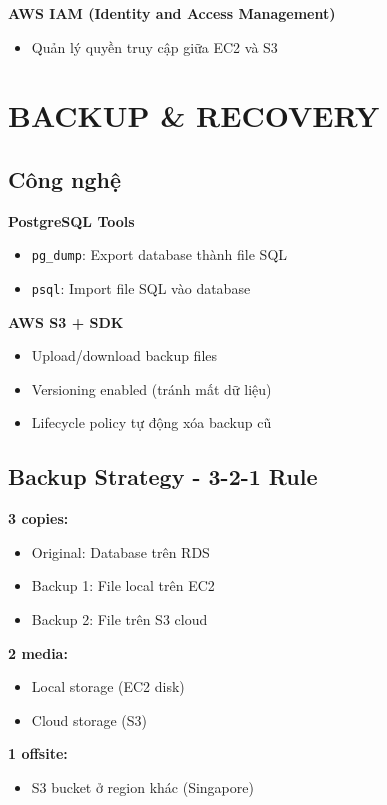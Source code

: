 \documentclass[12pt,a4paper]{article}
\begin{document}
\textbf{AWS IAM (Identity and Access Management)}
\begin{itemize}
    \item Quản lý quyền truy cập giữa EC2 và S3
\end{itemize}

\section{BACKUP \& RECOVERY}

\subsection{Công nghệ}

\textbf{PostgreSQL Tools}
\begin{itemize}
    \item \texttt{pg\_dump}: Export database thành file SQL
    \item \texttt{psql}: Import file SQL vào database
\end{itemize}

\textbf{AWS S3 + SDK}
\begin{itemize}
    \item Upload/download backup files
    \item Versioning enabled (tránh mất dữ liệu)
    \item Lifecycle policy tự động xóa backup cũ
\end{itemize}

\subsection{Backup Strategy - 3-2-1 Rule}

\textbf{3 copies:}
\begin{itemize}
    \item Original: Database trên RDS
    \item Backup 1: File local trên EC2
    \item Backup 2: File trên S3 cloud
\end{itemize}

\textbf{2 media:}
\begin{itemize}
    \item Local storage (EC2 disk)
    \item Cloud storage (S3)
\end{itemize}

\textbf{1 offsite:}
\begin{itemize}
    \item S3 bucket ở region khác (Singapore)
\end{itemize}
\end{document}
